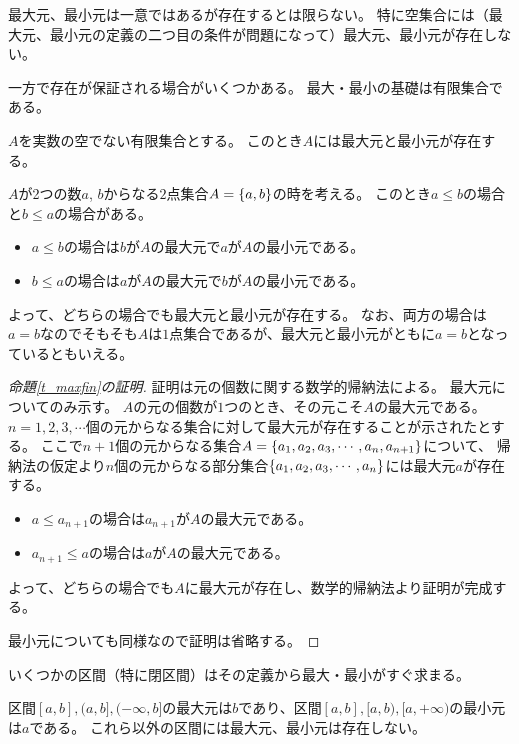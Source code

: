 最大元、最小元は一意ではあるが存在するとは限らない。
特に空集合には（最大元、最小元の定義の二つ目の条件が問題になって）最大元、最小元が存在しない。

一方で存在が保証される場合がいくつかある。
最大・最小の基礎は有限集合である。

\begin{proposition}
\label{t_maxfin}
$A$を実数の空でない有限集合とする。
このとき$A$には最大元と最小元が存在する。
\end{proposition}

\begin{example}
$A$が2つの数$a$, $b$からなる$2$点集合$A = \{ a, b \}$の時を考える。
このとき$a \le b$の場合と$b \le a$の場合がある。
\begin{itemize}
\item
$a \le b$の場合は$b$が$A$の最大元で$a$が$A$の最小元である。
\item
$b \le a$の場合は$a$が$A$の最大元で$b$が$A$の最小元である。
\end{itemize}
よって、どちらの場合でも最大元と最小元が存在する。
なお、両方の場合は$a = b$なのでそもそも$A$は$1$点集合であるが、最大元と最小元がともに$a = b$となっているともいえる。
\end{example}

\begin{proof}[命題\ref{t_maxfin}の証明]
証明は元の個数に関する数学的帰納法による。
最大元についてのみ示す。
$A$の元の個数が$1$つのとき、その元こそ$A$の最大元である。
$n = 1, 2, 3, \cdots$個の元からなる集合に対して最大元が存在することが示されたとする。
ここで$n+1$個の元からなる集合$A = \{ a_1, a_2, a_3, \cdots, a_n, a_{n+1} \}$について、
帰納法の仮定より$n$個の元からなる部分集合$\{ a_1, a_2, a_3, \cdots, a_n \}$には最大元$a$が存在する。
\begin{itemize}
\item
$a \le a_{n+1}$の場合は$a_{n+1}$が$A$の最大元である。
\item
$a_{n+1} \le a$の場合は$a$が$A$の最大元である。
\end{itemize}
よって、どちらの場合でも$A$に最大元が存在し、数学的帰納法より証明が完成する。

最小元についても同様なので証明は省略する。
\end{proof}

いくつかの区間（特に閉区間）はその定義から最大・最小がすぐ求まる。

\begin{example}
区間$[a, b], (a, b], (-\infty, b]$の最大元は$b$であり、区間$[a, b], [a, b), [a, +\infty)$の最小元は$a$である。
これら以外の区間には最大元、最小元は存在しない。
\end{example}

